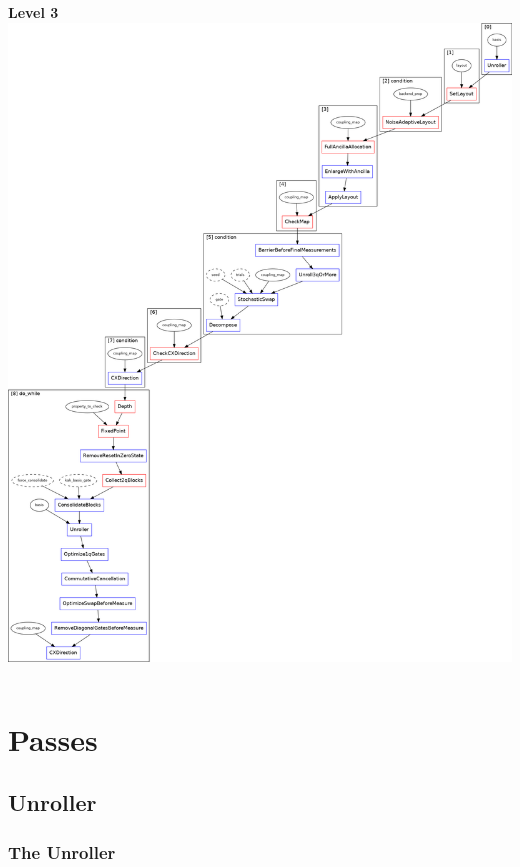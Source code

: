 \documentclass[aspectratio=169,11pt,hyperref={colorlinks=true}]{beamer}
\begin{document}
\begin{frame}
\begin{columns}
{        
            \centering
            \textbf{Level 3}\\
            \includegraphics[width=\textwidth,height=.75\textheight,keepaspectratio]{preset_level_3.png}
    }
    \end{columns}
\end{frame}

\section{Passes}
\subsection{Unroller}
\begin{frame}
    \frametitle{The Unroller}
\end{frame}
\end{document}
